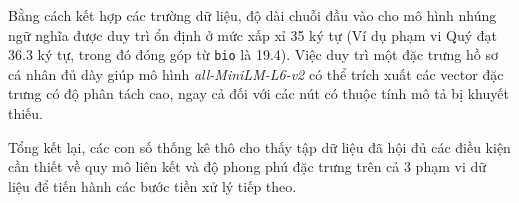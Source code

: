 Bằng cách kết hợp các trường dữ liệu, độ dài chuỗi đầu vào cho mô hình nhúng ngữ nghĩa được duy trì ổn định ở mức xấp xỉ 35 ký tự (Ví dụ phạm vi Quý đạt 36.3 ký tự, trong đó đóng góp từ \texttt{bio} là 19.4). Việc duy trì một đặc trưng hồ sơ cá nhân đủ dày giúp mô hình \textit{all-MiniLM-L6-v2} có thể trích xuất các vector đặc trưng có độ phân tách cao, ngay cả đối với các nút có thuộc tính mô tả bị khuyết thiếu.\vspace{0.3cm}

Tổng kết lại, các con số thống kê thô cho thấy tập dữ liệu đã hội đủ các điều kiện cần thiết về quy mô liên kết và độ phong phú đặc trưng trên cả 3 phạm vi dữ liệu để tiến hành các bước tiền xử lý tiếp theo.